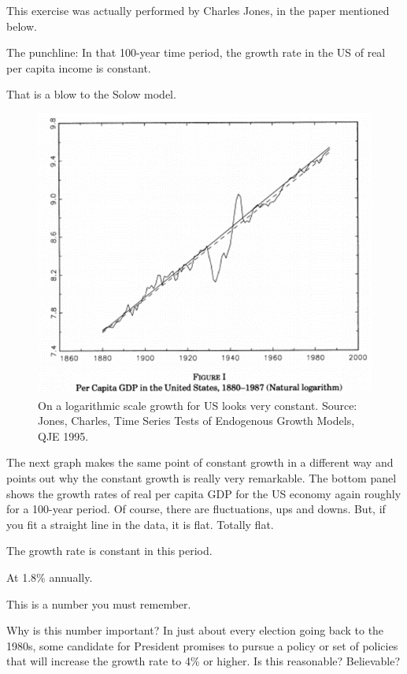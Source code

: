 \documentclass[
]{book}
\begin{document}
This exercise was actually performed by Charles Jones, in the paper mentioned below.

The punchline: In that 100-year time period, the growth rate in the US of real per capita income is constant.

That is a blow to the Solow model.

\begin{figure}
\includegraphics[width=1\linewidth]{img/ch1/growth11} \caption{On a logarithmic scale growth for US looks very constant. Source: Jones, Charles, Time Series Tests of Endogenous Growth Models, QJE 1995.}\label{fig:fig111}
\end{figure}

The next graph makes the same point of constant growth in a different way and points out why the constant growth is really very remarkable.
The bottom panel shows the growth rates of real per capita GDP for the US economy again roughly for a 100-year period. Of course, there are fluctuations, ups and downs. But, if you fit a straight line in the data, it is flat. Totally flat.

The growth rate is constant in this period.

At 1.8\% annually.

This is a number you must remember.

Why is this number important? In just about every election going back to the 1980s, some candidate for President promises to pursue a policy or set of policies that will increase the growth rate to 4\% or higher.
Is this reasonable? Believable?
\end{document}
